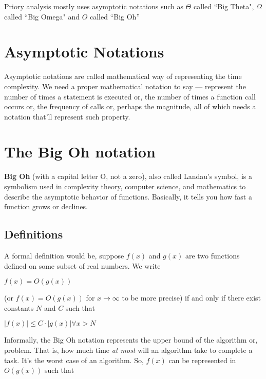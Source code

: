 \documentclass[a4paper,12pt]{article}
\theoremstyle{definition}
\begin{document}
    \noindent
    Priory analysis mostly uses asymptotic notations such as $\Theta$ called ``Big Theta", $\Omega$ called ``Big Omega" and $O$ called ``Big Oh''

    \section*{Asymptotic Notations}

    Asymptotic notations are called mathematical way of representing the time complexity. We need a proper mathematical notation to say --- represent the number of times a statement is executed or, the number of times a function call occurs or, the frequency of calls or, perhaps the magnitude, all of which needs a notation that'll represent such property.


    \section{The Big Oh notation}

    \textbf{Big Oh} (with a capital letter O, not a zero), also called Landau's symbol, is a symbolism used in complexity theory, computer science, and mathematics to describe the asymptotic behavior of functions. Basically, it tells you how fast a function grows or declines.

    \subsection{Definitions}

    A formal definition would be, suppose $f(x)$ and $g(x)$ are two functions defined on some subset of real numbers. We write

    \begin{center}
        $f(x) = O(g(x))$
    \end{center}

    \noindent
    (or $f(x) = O(g(x))$ for $x \rightarrow \infty$ to be more precise) if and only if there exist constants $N$ and $C$ such that

    \begin{center}
        $|f(x)| \leq C \cdot |g(x)| \forall x > N$
    \end{center}

    \noindent
    Informally, the Big Oh notation represents the upper bound of the algorithm or, problem. That is, how much time \emph{at most} will an algorithm take to complete a task. It's the worst case of an algorithm. So, $f(x)$ can be represented in $O(g(x))$ such that
\end{document}
